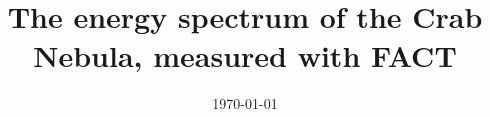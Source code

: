


\title{The energy spectrum of the Crab Nebula, measured with FACT}
\date{%
   \today %
}



\maketitle
\thispagestyle{empty}
\tableofcontents
\newpage





\printbibliography{}


